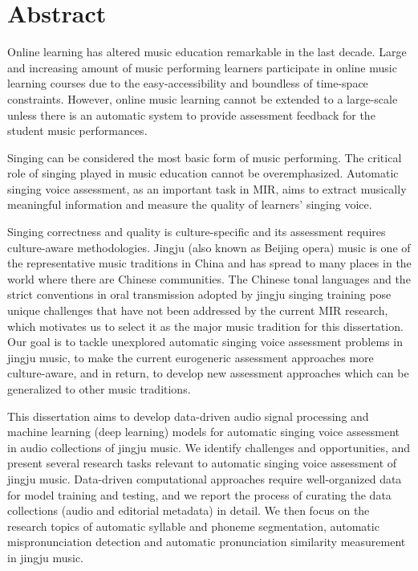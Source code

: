 \chapter{Abstract}
\vspace*{-1cm}
Online learning has altered music education remarkable in the last decade. Large and increasing amount of music performing learners participate in online music learning courses due to the easy-accessibility and boundless of time-space constraints. However, online music learning cannot be extended to a large-scale unless there is an automatic system to provide assessment feedback for the student music performances.

Singing can be considered the most basic form of music performing. The critical role of singing played in music education cannot be overemphasized. Automatic singing voice assessment, as an important task in \gls{MIR}, aims to extract musically meaningful information and measure the quality of learners' singing voice.

Singing correctness and quality is culture-specific and its assessment requires culture-aware methodologies. Jingju (also known as Beijing opera) music is one of the representative music traditions in China and has spread to many places in the world where there are Chinese communities. The Chinese tonal languages and the strict conventions in oral transmission adopted by jingju singing training pose unique challenges that have not been addressed by the current \gls{MIR} research, which motivates us to select it as the major music tradition for this dissertation. Our goal is to tackle unexplored automatic singing voice assessment problems in jingju music, to make the current eurogeneric assessment approaches more culture-aware, and in return, to develop new assessment approaches which can be generalized to other music traditions.

This dissertation aims to develop data-driven audio signal processing and machine learning (deep learning) models for automatic singing voice assessment in audio collections of jingju music. We identify challenges and opportunities, and present several research tasks relevant to automatic singing voice assessment of jingju music. Data-driven computational approaches require well-organized data for model training and testing, and we report the process of curating the data collections (audio and editorial metadata) in detail. We then focus on the research topics of automatic syllable and phoneme segmentation, automatic mispronunciation detection and automatic pronunciation similarity measurement in jingju music.


